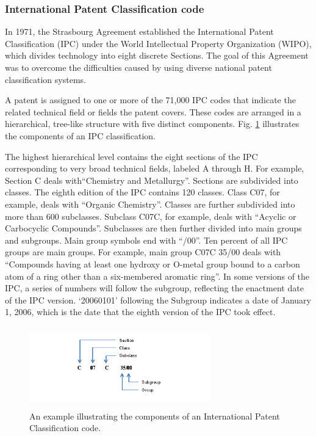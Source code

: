 
\subsubsection{International Patent Classification code}
In 1971, the Strasbourg Agreement established the International Patent Classification (IPC) under the World Intellectual Property Organization (WIPO), which divides technology into eight discrete Sections. The goal of this
Agreement was to overcome the difficulties caused by using diverse national patent classification systems.~\citep{harris2010comparison}

A patent is assigned to one or more of the 71,000 IPC codes that 
indicate the related technical field or fields the patent covers. 
These codes are arranged in a hierarchical, tree-like structure with 
five distinct components. Fig. \ref{fig:ipcexample} illustrates the components of an IPC classification.

The highest hierarchical level contains the eight sections of the IPC corresponding
to very broad technical fields, labeled A through H. For example, Section C deals
with``Chemistry and Metallurgy''. Sections are subdivided into classes. The eighth edition of the IPC contains 120
classes. Class C07, for example, deals with ``Organic Chemistry''. Classes are further subdivided into more than 600 subclasses. Subclass C07C, for example, deals with ``Acyclic or Carbocyclic Compounds''. Subclasses are then further divided into main groups and subgroups. Main group symbols end with ``/00''. Ten percent of all IPC groups are main
groups. For example, main group C07C 35/00 deals with ``Compounds having at
least one hydroxy or O-metal group bound to a carbon atom of a ring other than
a six-membered aromatic ring''. In some versions of the IPC, a series of numbers will follow the subgroup, reflecting
the enactment date of the IPC version. `20060101' following the Subgroup
indicates a date of January 1, 2006, which is the date that the eighth version of
the IPC took effect. 
\begin{figure}[t!]
   \centering
   \includegraphics[width=0.70\textwidth,height=35mm]{figs/IPCexample.jpg}
   \caption{An example illustrating the components of an International Patent Classification code.}   
   \label{fig:ipcexample} 
\end{figure}
